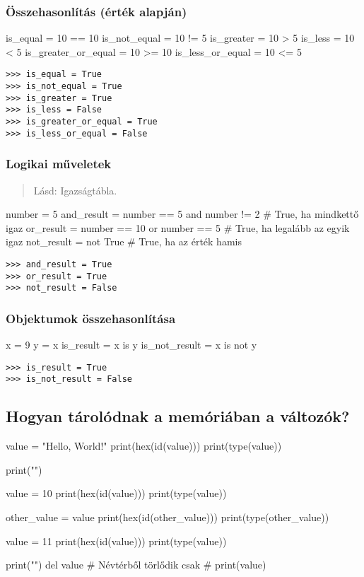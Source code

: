 \subsubsection{Összehasonlítás (érték alapján)}
\begin{pycode}
    is_equal = 10 == 10
    is_not_equal = 10 != 5
    is_greater = 10 > 5
    is_less = 10 < 5
    is_greater_or_equal = 10 >= 10
    is_less_or_equal = 10 <= 5
\end{pycode}
\begin{verbatim}
>>> is_equal = True
>>> is_not_equal = True
>>> is_greater = True
>>> is_less = False
>>> is_greater_or_equal = True
>>> is_less_or_equal = False
\end{verbatim}

\clearpage
\subsubsection{Logikai műveletek}
\begin{quote}
    Lásd: Igazságtábla.
\end{quote}
\begin{pycode}
number = 5
and_result = number == 5 and number != 2  # True, ha mindkettő igaz
or_result = number == 10 or number == 5  # True, ha legalább az egyik igaz
not_result = not True  # True, ha az érték hamis
\end{pycode}
\begin{verbatim}
>>> and_result = True
>>> or_result = True
>>> not_result = False
\end{verbatim}

\subsubsection{Objektumok összehasonlítása}
\begin{pycode}
x = 9
y = x
is_result = x is y
is_not_result = x is not y
\end{pycode}
\begin{verbatim}
>>> is_result = True
>>> is_not_result = False
\end{verbatim}

\subsection{Hogyan tárolódnak a memóriában a változók?}
\begin{minipage}{0.5\textwidth}
\begin{pycode}
value = "Hello, World!"
print(hex(id(value)))
print(type(value))

print("\n")

value = 10
print(hex(id(value)))
print(type(value))

other_value = value
print(hex(id(other_value)))
print(type(other_value))

value = 11
print(hex(id(value)))
print(type(value))

print("\n")
del value  # Névtérből törlődik csak
# print(value)
\end{pycode}
\end{minipage}
\begin{minipage}{0.5\textwidth}
\end{minipage}